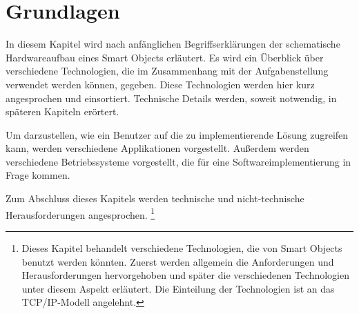 

\chapter{Grundlagen} \label{Grundlagen}


In diesem Kapitel wird nach anfänglichen Begriffserklärungen der schematische Hardwareaufbau eines Smart Objects erläutert. Es wird ein Überblick über verschiedene Technologien, die im Zusammenhang mit der Aufgabenstellung verwendet werden können, gegeben. Diese Technologien werden hier kurz angesprochen und einsortiert. Technische Details werden, soweit notwendig, in späteren Kapiteln erörtert.


Um darzustellen, wie ein Benutzer auf die zu implementierende Lösung zugreifen kann, werden verschiedene Applikationen vorgestellt. Außerdem werden verschiedene Betriebssysteme vorgestellt, die für eine Softwareimplementierung in Frage kommen.

Zum Abschluss dieses Kapitels werden technische und nicht-technische Herausforderungen angesprochen. 
\footnote{Dieses Kapitel behandelt verschiedene Technologien, die von Smart Objects benutzt werden könnten. Zuerst werden allgemein die Anforderungen und Herausforderungen hervorgehoben und später die verschiedenen Technologien unter diesem Aspekt erläutert. Die Einteilung der Technologien ist an das TCP/IP-Modell angelehnt.}

